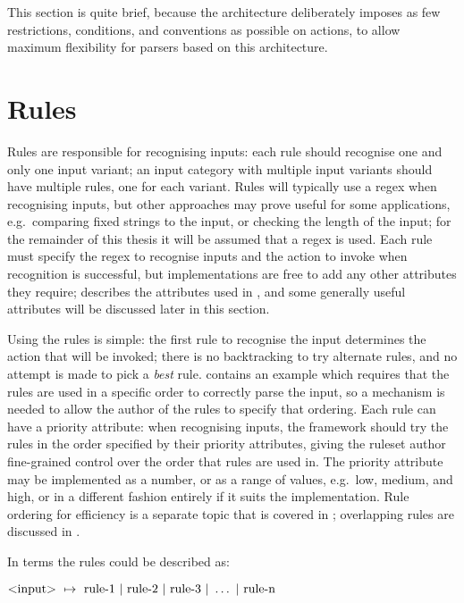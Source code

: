 This section is quite brief, because the architecture deliberately imposes
as few restrictions, conditions, and conventions as possible on actions, to
allow maximum flexibility for parsers based on this architecture.

\section{Rules}

\label{rules in architecture}

Rules are responsible for recognising inputs: each rule should recognise
one and only one input variant; an input category with multiple input
variants should have multiple rules, one for each variant.  Rules will
typically use a regex when recognising inputs, but other approaches may
prove useful for some applications, e.g.\ comparing fixed strings to the
input, or checking the length of the input; for the remainder of this
thesis it will be assumed that a regex is used.  Each rule must specify the
regex to recognise inputs and the action to invoke when recognition is
successful, but implementations are free to add any other attributes they
require;  describes the attributes used in
\parsername{}, and some generally useful attributes will be discussed later
in this section.

Using the rules is simple: the first rule to recognise the input determines
the action that will be invoked; there is no backtracking to try alternate
rules, and no attempt is made to pick a \textit{best\/} rule.
 contains an example which
requires that the rules are used in a specific order to correctly parse the
input, so a mechanism is needed to allow the author of the rules to specify
that ordering.  Each rule can have a priority attribute: when recognising
inputs, the framework should try the rules in the order specified by their
priority attributes, giving the ruleset author fine-grained control over
the order that rules are used in.  The priority attribute may be
implemented as a number, or as a range of values, e.g.\ low, medium, and
high, or in a different fashion entirely if it suits the implementation.
Rule ordering for efficiency is a separate topic that is covered in
; overlapping rules are discussed
in .

In  terms the rules could be described as:

\tab{}$\text{\textless{}input\textgreater{}}~\mapsto{}~\text{rule-1}~|~\text{rule-2}~|~\text{rule-3}~|~\dots~|~\text{rule-n}$

